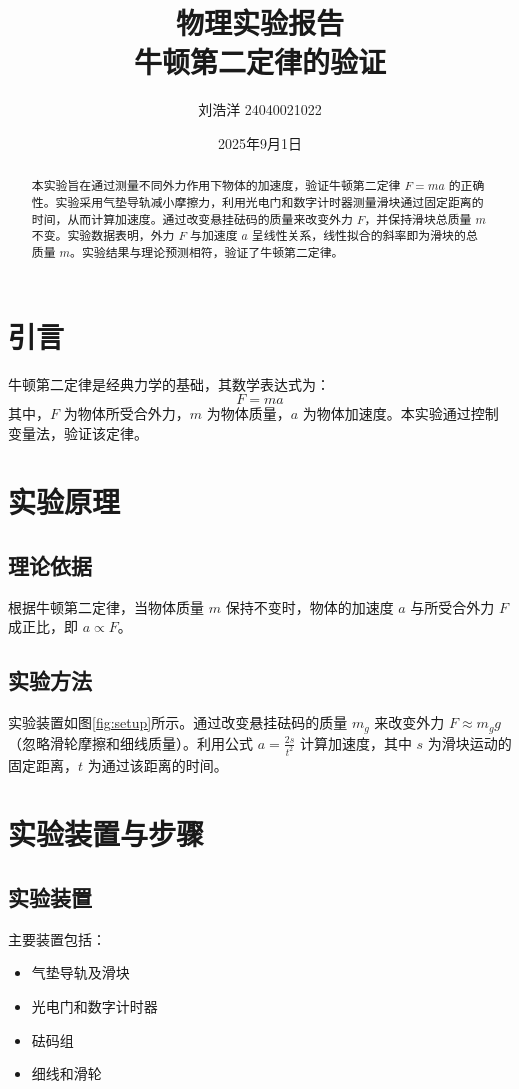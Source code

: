 \documentclass[12pt,a4paper]{article}
\title{物理实验报告\\\large 牛顿第二定律的验证}
\author{刘浩洋 24040021022}
\date{2025年9月1日}
\begin{document}
\maketitle

\begin{abstract}
本实验旨在通过测量不同外力作用下物体的加速度，验证牛顿第二定律 $F = ma$ 的正确性。实验采用气垫导轨减小摩擦力，利用光电门和数字计时器测量滑块通过固定距离的时间，从而计算加速度。通过改变悬挂砝码的质量来改变外力 $F$，并保持滑块总质量 $m$ 不变。实验数据表明，外力 $F$ 与加速度 $a$ 呈线性关系，线性拟合的斜率即为滑块的总质量 $m$。实验结果与理论预测相符，验证了牛顿第二定律。
\end{abstract}

\tableofcontents
\newpage %

\section{引言}
牛顿第二定律是经典力学的基础，其数学表达式为：
\begin{equation}
    F = ma
\end{equation}
其中，$F$ 为物体所受合外力，$m$ 为物体质量，$a$ 为物体加速度。本实验通过控制变量法，验证该定律。

\section{实验原理}
\subsection{理论依据}
根据牛顿第二定律，当物体质量 $m$ 保持不变时，物体的加速度 $a$ 与所受合外力 $F$ 成正比，即 $a \propto F$。

\subsection{实验方法}
实验装置如图\ref{fig:setup}所示。通过改变悬挂砝码的质量 $m_g$ 来改变外力 $F \approx m_g g$（忽略滑轮摩擦和细线质量）。利用公式 $a = \frac{2s}{t^2}$ 计算加速度，其中 $s$ 为滑块运动的固定距离，$t$ 为通过该距离的时间。

\section{实验装置与步骤}
\subsection{实验装置}
主要装置包括：
\begin{itemize}
    \item 气垫导轨及滑块
    \item 光电门和数字计时器
    \item 砝码组
    \item 细线和滑轮
\end{itemize}
\end{document}
